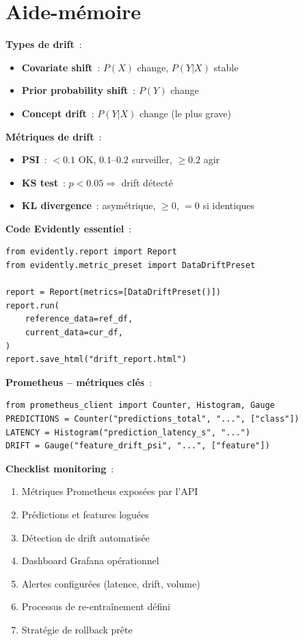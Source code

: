 \section{Aide-m\'emoire}
\label{sec:monitoring-cheatsheet}

\begin{cheatsheet}[title=\textbf{Monitoring des mod\`eles ML}]
\textbf{Types de drift}~:
\begin{itemize}
    \item \textbf{Covariate shift}~: $P(X)$ change, $P(Y|X)$ stable
    \item \textbf{Prior probability shift}~: $P(Y)$ change
    \item \textbf{Concept drift}~: $P(Y|X)$ change (le plus grave)
\end{itemize}

\textbf{M\'etriques de drift}~:
\begin{itemize}
    \item \textbf{PSI}~: $< 0.1$ OK, $0.1$--$0.2$ surveiller, $\geq 0.2$ agir
    \item \textbf{KS test}~: $p < 0.05 \Rightarrow$ drift d\'etect\'e
    \item \textbf{KL divergence}~: asym\'etrique, $\geq 0$, $= 0$ si identiques
\end{itemize}

\textbf{Code Evidently essentiel}~:
\begin{verbatim}
from evidently.report import Report
from evidently.metric_preset import DataDriftPreset

report = Report(metrics=[DataDriftPreset()])
report.run(
    reference_data=ref_df,
    current_data=cur_df,
)
report.save_html("drift_report.html")
\end{verbatim}

\textbf{Prometheus -- m\'etriques cl\'es}~:
\begin{verbatim}
from prometheus_client import Counter, Histogram, Gauge
PREDICTIONS = Counter("predictions_total", "...", ["class"])
LATENCY = Histogram("prediction_latency_s", "...")
DRIFT = Gauge("feature_drift_psi", "...", ["feature"])
\end{verbatim}

\textbf{Checklist monitoring}~:
\begin{enumerate}
    \item[$\square$] M\'etriques Prometheus expos\'ees par l'API
    \item[$\square$] Pr\'edictions et features logu\'ees
    \item[$\square$] D\'etection de drift automatis\'ee
    \item[$\square$] Dashboard Grafana op\'erationnel
    \item[$\square$] Alertes configur\'ees (latence, drift, volume)
    \item[$\square$] Processus de re-entra\^inement d\'efini
    \item[$\square$] Strat\'egie de rollback pr\^ete
\end{enumerate}
\end{cheatsheet}
